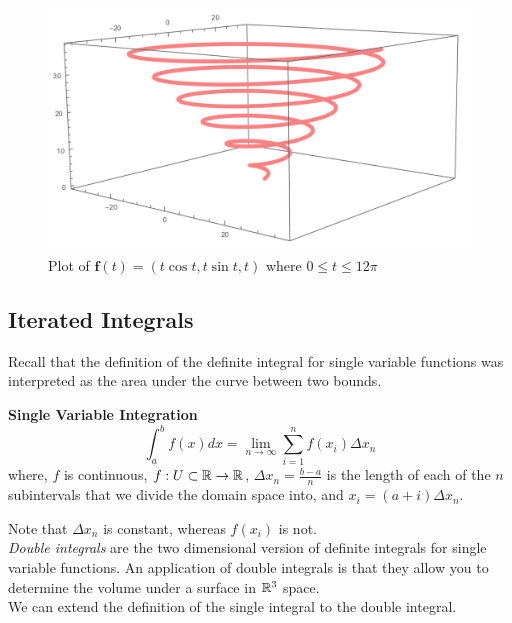 \documentclass[12pt]{article}
\begin{document}
\begin{figure}[h]
\centering
\caption{Plot of $\mathbf{f}(t) = (t\cos{t}, t\sin{t}, t)$ where $0\leq t\leq 12\pi$}
\label{fig:spiral3d}
\indent\includegraphics[scale=0.4]{spiral3d.png}
\end{figure}



\subsection{Iterated Integrals}

Recall that the definition of the definite integral for single variable functions was interpreted as the area under the curve between two bounds. \\

\begin{framed}
\textbf{Single Variable Integration}
\[
\int_a^b f(x) dx = \lim_{n\rightarrow\infty}\sum_{i=1}^n f(x_i)\Delta x_n
\]
where, $f$ is continuous, $f:U\subset\mathbb{R}\rightarrow\mathbb{R}$, $\Delta x_n=\frac{b-a}{n}$ is the length of each of the $n$ subintervals that we divide the domain space into, and $x_i = (a+i)\Delta x_n$.
\end{framed}

Note that $\Delta x_n$ is constant, whereas $f(x_i)$ is not.\\

\emph{Double integrals} are the two dimensional version of definite integrals for single variable functions. An application of double integrals is that they allow you to determine the volume under a surface in $\mathbb{R}^3$ space.\\

We can extend the definition of the single integral to the double integral. \\
\end{document}
